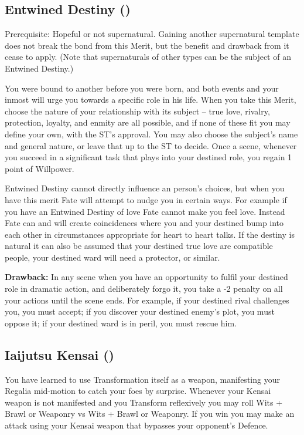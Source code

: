 \subsection*{Entwined Destiny (\textbullet\textbullet\textbullet)}

Prerequisite: Hopeful or not supernatural. Gaining another supernatural template does not break the bond from this Merit, but the benefit and drawback from it cease to apply. (Note that supernaturals of other types can be the subject of an Entwined Destiny.)

You were bound to another before you were born, and both events and your inmost will urge you towards a specific role in his life. When you take this Merit, choose the nature of your relationship with its subject -- true love, rivalry, protection, loyalty, and enmity are all possible, and if none of these fit you may define your own, with the ST's approval. You may also choose the subject's name and general nature, or leave that up to the ST to decide. Once a scene, whenever you succeed in a significant task that plays into your destined role, you regain 1 point of Willpower.

Entwined Destiny cannot directly influence an person's choices, but when you have this merit Fate will attempt to nudge you in certain ways. For example if you have an Entwined Destiny of love Fate cannot make you feel love. Instead Fate can and will create coincidences where you and your destined bump into each other in circumstances appropriate for heart to heart talks. If the destiny is natural it can also be assumed that your destined true love are compatible people, your destined ward will need a protector, or similar.

\textbf{Drawback:} In any scene when you have an opportunity to fulfil your destined role in dramatic action, and deliberately forgo it, you take a -2 penalty on all your actions until the scene ends. For example, if your destined rival challenges you, you must accept; if you discover your destined enemy's plot, you must oppose it; if your destined ward is in peril, you must rescue him.

\subsection*{Iaijutsu Kensai (\textbullet\textbullet)}

You have learned to use Transformation itself as a weapon, manifesting your Regalia mid-motion to catch your foes by surprise. Whenever your Kensai weapon is not manifested and you Transform reflexively you may roll Wits + Brawl or Weaponry vs Wits + Brawl or Weaponry. If you win you may make an attack using your Kensai weapon that bypasses your opponent's Defence. 

